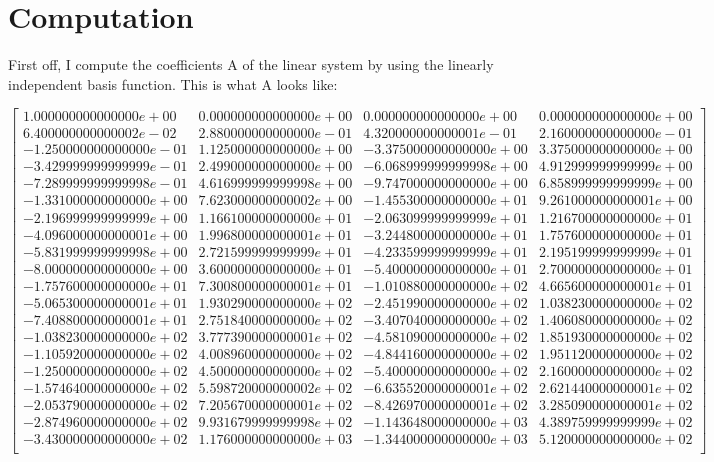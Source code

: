 \documentclass{article}
\begin{document}
\section{Computation}
First off, I compute the coefficients A of the linear system by using the linearly independent basis function. This is what A looks like:

$$
\begin{bmatrix} 
1.000000000000000e+00 & 0.000000000000000e+00 & 0.000000000000000e+00 & 0.000000000000000e+00 \\
6.400000000000002e-02 & 2.880000000000000e-01 & 4.320000000000001e-01 & 2.160000000000000e-01 \\
-1.250000000000000e-01 & 1.125000000000000e+00 & -3.375000000000000e+00 & 3.375000000000000e+00 \\
-3.429999999999999e-01 & 2.499000000000000e+00 & -6.068999999999998e+00 & 4.912999999999999e+00 \\
-7.289999999999998e-01 & 4.616999999999998e+00 & -9.747000000000000e+00 & 6.858999999999999e+00 \\
-1.331000000000000e+00 & 7.623000000000002e+00 & -1.455300000000000e+01 & 9.261000000000001e+00 \\
-2.196999999999999e+00 & 1.166100000000000e+01 & -2.063099999999999e+01 & 1.216700000000000e+01 \\
-4.096000000000001e+00 & 1.996800000000001e+01 & -3.244800000000000e+01 & 1.757600000000000e+01 \\
-5.831999999999998e+00 & 2.721599999999999e+01 & -4.233599999999999e+01 & 2.195199999999999e+01 \\
-8.000000000000000e+00 & 3.600000000000000e+01 & -5.400000000000000e+01 & 2.700000000000000e+01 \\
-1.757600000000000e+01 & 7.300800000000001e+01 & -1.010880000000000e+02 & 4.665600000000001e+01 \\
-5.065300000000001e+01 & 1.930290000000000e+02 & -2.451990000000000e+02 & 1.038230000000000e+02 \\
-7.408800000000001e+01 & 2.751840000000000e+02 & -3.407040000000000e+02 & 1.406080000000000e+02 \\
-1.038230000000000e+02 & 3.777390000000001e+02 & -4.581090000000000e+02 & 1.851930000000000e+02 \\
-1.105920000000000e+02 & 4.008960000000000e+02 & -4.844160000000000e+02 & 1.951120000000000e+02 \\
-1.250000000000000e+02 & 4.500000000000000e+02 & -5.400000000000000e+02 & 2.160000000000000e+02 \\
-1.574640000000000e+02 & 5.598720000000002e+02 & -6.635520000000001e+02 & 2.621440000000001e+02 \\
-2.053790000000000e+02 & 7.205670000000001e+02 & -8.426970000000001e+02 & 3.285090000000001e+02 \\
-2.874960000000000e+02 & 9.931679999999998e+02 & -1.143648000000000e+03 & 4.389759999999999e+02 \\
-3.430000000000000e+02 & 1.176000000000000e+03 & -1.344000000000000e+03 & 5.120000000000000e+02 \\\end{bmatrix}
$$
\end{document}
